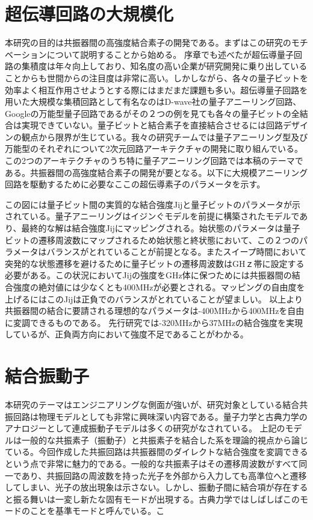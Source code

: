 \section{超伝導回路の大規模化}
    本研究の目的は共振器間の高強度結合素子の開発である。まずはこの研究のモチベーションについて説明することから始める。
    序章でも述べたが超伝導量子回路の集積度は年々向上しており、知名度の高い企業が研究開発に乗り出していることからも世間からの注目度は非常に高い。しかしながら、各々の量子ビットを効率よく相互作用させようとする際にはまだまだ課題も多い。超伝導量子回路を用いた大規模な集積回路として有名なのはD-wave社の量子アニーリング回路、Googleの万能型量子回路であるがその２つの例を見ても各々の量子ビットの全結合は実現できていない。量子ビットと結合素子を直接結合させるには回路デザインの観点から限界が生じている。我々の研究チームでは量子アニーリング型及び万能型のそれぞれについて2次元回路アーキテクチャの開発に取り組んでいる。この2つのアーキテクチャのうち特に量子アニーリング回路では本稿のテーマである。共振器間の高強度結合素子の開発が要となる。以下に大規模アニーリング回路を駆動するために必要なここの超伝導素子のパラメータを示す。

    この図には量子ビット間の実質的な結合強度Jijと量子ビットのパラメータが示されている。量子アニーリングはイジンぐモデルを前提に構築されたモデルであり、最終的な解は結合強度Jijにマッピングされる。始状態のパラメータは量子ビットの遷移周波数にマップされるため始状態と終状態において、この２つのパラメータはバランスがとれていることが前提となる。またスイープ時間において突発的な状態遷移を避けるために量子ビットの遷移周波数はGHｚ帯に設定する必要がある。この状況においてJijの強度をGHz体に保つためには共振器間の結合強度の絶対値には少なくとも400MHzが必要とされる。マッピングの自由度を上げるにはこのJijは正負でのバランスがとれていることが望ましい。
    以上より共振器間の結合に要請される理想的なパラメータは-400MHzから400MHzを自由に変調できるものである。
    先行研究\cite*{Wulschner2016}では-320MHzから37MHzの結合強度を実現しているが、正負両方向において強度不足であることがわかる。

\section{}

\section{結合振動子}
    本研究のテーマはエンジニアリングな側面が強いが、研究対象としている結合共振回路は物理モデルとしても非常に興味深い内容である。量子力学と古典力学のアナロジーとして連成振動子モデルは多くの研究がなされている。\cite*{Rodriguez2016}\cite*{Ivakhnenko2018}\cite*{Novotny2010}
    上記のモデルは一般的な共振素子（振動子）と共振素子を結合した系を理論的視点から論じている。今回作成した共振回路は共振器間のダイレクトな結合強度を変調できるという点で非常に魅力的である。一般的な共振素子はその遷移周波数がすべて同一であり、共振回路の周波数を持った光子を外部から入力しても高準位へと遷移してしまい、光子の放出現象は示さない。しかし、振動子間に結合項が存在すると振る舞いは一変し新たな固有モードが出現する。古典力学ではしばしばこのモードのことを基準モードと呼んでいる。こ
